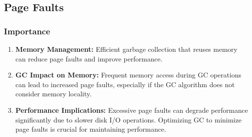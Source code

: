 \documentclass[10pt]{article}
\begin{document}
\subsection{Page Faults}
\subsubsection{Importance}
\begin{enumerate}
  \item \textbf{Memory Management:} Efficient garbage collection that reuses memory can reduce page faults and improve performance.
  \item \textbf{GC Impact on Memory:} Frequent memory access during GC operations can lead to increased page faults, especially if the GC algorithm does not consider memory locality.
  \item \textbf{Performance Implications:} Excessive page faults can degrade performance significantly due to slower disk I/O operations. Optimizing GC to minimize page faults is crucial for maintaining performance.
\end{enumerate}
\end{document}
